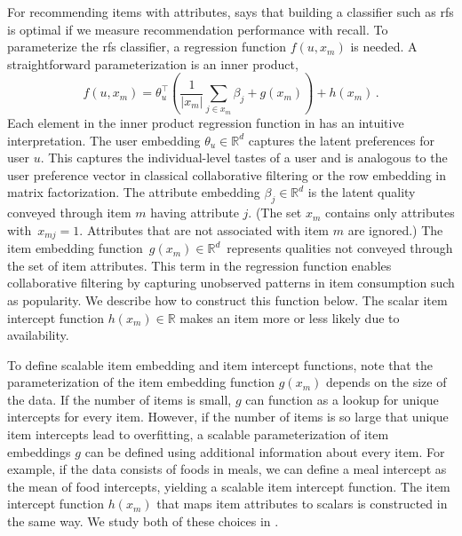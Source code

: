 For recommending items with attributes,  says that building a classifier such as \gls{rfs} is optimal if we measure recommendation performance with recall. To parameterize the \gls{rfs} classifier, a regression function $f(u, x_m)$ is needed. A straightforward parameterization is an inner product,
\begin{equation}
\label{eqn:rankfromsets}
  f\left(u, x_m\right) = \theta_u^\top\left(\frac{1}{|x_m|}\sum_{j\in x_m}
  \beta_j + g(x_m)\right) + h(x_m) \, .
\end{equation}
Each element in the inner product regression function in  has an intuitive interpretation. The user embedding $\theta_u \in \mathbb{R}^d$ captures the latent preferences for user $u$. This captures the individual-level tastes of a user and is analogous to the user preference vector in classical collaborative filtering or the row embedding in matrix factorization. The attribute embedding $\beta_j \in \mathbb{R}^d$ is the latent quality conveyed through item $m$ having attribute $j$. (The set $x_m$ contains only attributes with~$x_{mj}=1$. Attributes that are not associated with item $m$ are ignored.) The item embedding function~${g(x_m)\in\mathbb{R}^d}$~represents qualities not conveyed through the set of item attributes. This term in the regression function enables collaborative filtering by capturing unobserved patterns in item consumption such as popularity. We describe how to construct this function below. The scalar item intercept function $h(x_m) \in \mathbb{R}$ makes an item more or less likely due to availability.


To define scalable item embedding and item intercept functions, note that the parameterization of the item embedding function $g(x_m)$ depends on the size of the data. If the number of items is small, $g$ can function as a lookup for unique intercepts for every item. However, if the number of items is so large that unique item intercepts lead to overfitting, a scalable parameterization of item embeddings $g$ can be defined using additional information about every item. For example, if the data consists of foods in meals, we can define a meal intercept as the mean of food intercepts, yielding a scalable item intercept function. The item intercept function $h(x_m)$ that maps item attributes to scalars is constructed in the same way. We study both of these choices in .

